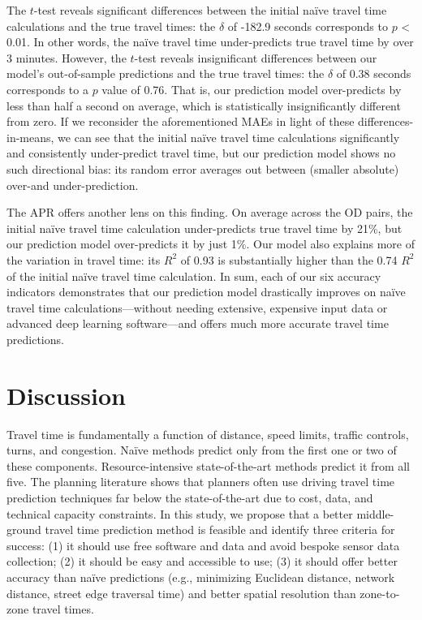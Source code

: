 \documentclass[12pt,letterpaper]{article} %
\begin{document}
The $t$-test reveals significant differences between the initial naïve travel time calculations and the true travel times: the $\delta$ of -182.9 seconds corresponds to $p$ < 0.01. In other words, the naïve travel time under-predicts true travel time by over 3 minutes. However, the $t$-test reveals insignificant differences between our model's out-of-sample predictions and the true travel times: the $\delta$ of 0.38 seconds corresponds to a $p$ value of 0.76. That is, our prediction model over-predicts by less than half a second on average, which is statistically insignificantly different from zero. If we reconsider the aforementioned MAEs in light of these differences-in-means, we can see that the initial naïve travel time calculations significantly and consistently under-predict travel time, but our prediction model shows no such directional bias: its random error averages out between (smaller absolute) over-and under-prediction.

The APR offers another lens on this finding. On average across the OD pairs, the initial naïve travel time calculation under-predicts true travel time by 21\%, but our prediction model over-predicts it by just 1\%. Our model also explains more of the variation in travel time: its $R^2$ of 0.93 is substantially higher than the 0.74 $R^2$ of the initial naïve travel time calculation. In sum, each of our six accuracy indicators demonstrates that our prediction model drastically improves on naïve travel time calculations---without needing extensive, expensive input data or advanced deep learning software---and offers much more accurate travel time predictions.

\section{Discussion}

Travel time is fundamentally a function of distance, speed limits, traffic controls, turns, and congestion. Naïve methods predict only from the first one or two of these components. Resource-intensive state-of-the-art methods predict it from all five. The planning literature shows that planners often use driving travel time prediction techniques far below the state-of-the-art due to cost, data, and technical capacity constraints. In this study, we propose that a better middle-ground travel time prediction method is feasible and identify three criteria for success: (1) it should use free software and data and avoid bespoke sensor data collection; (2) it should be easy and accessible to use; (3) it should offer better accuracy than naïve predictions (e.g., minimizing Euclidean distance, network distance, street edge traversal time) and better spatial resolution than zone-to-zone travel times.
\end{document}
